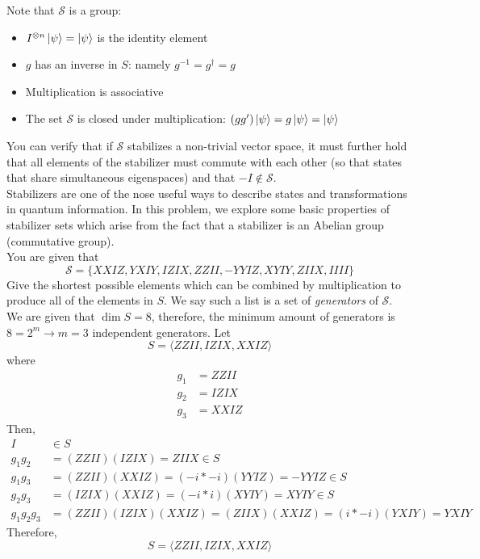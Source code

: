 Note that $\mathcal{S}$ is a group:
\begin{itemize}
    \item $I^{\otimes n} \ket{\psi} = \ket{\psi}$ is the identity element
    \item $g$ has an inverse in $S$: namely $g^{-1} = g^{\dagger} = g$ 
    \item Multiplication is associative
    \item The set $\mathcal{S}$ is closed under multiplication: $(gg')\ket{\psi} = g\ket{\psi} = \ket{\psi}$
\end{itemize}
You can verify that if $\mathcal{S}$ stabilizes a non-trivial vector space, it must further hold that all elements of the stabilizer must commute with each other (so that states that share simultaneous eigenspaces) and that $-I \notin \mathcal{S}$. \\

Stabilizers are one of the nose useful ways to describe states and transformations in quantum information. In this problem, we explore some basic properties of stabilizer sets which arise from the fact that a stabilizer is an Abelian group (commutative group). \\

You are given that 
\begin{equation}
    \mathcal{S} = \{XXIZ, YXIY,IZIX,ZZII,-YYIZ,XYIY,ZIIX,IIII\}
\end{equation}
Give the shortest possible elements which can be combined by multiplication to produce all of the elements in $S$. We say such a list is a set of \textit{generators} of $\mathcal{S}$. \\

We are given that $\dim{S} = 8$, therefore, the minimum amount of generators is $8=2^m \rightarrow m=3$ independent generators. Let 
\begin{equation}
    S = \langle ZZII, IZIX, XXIZ\rangle
\end{equation}
where
\begin{align}
    g_1 &= ZZII \\
    g_2 &= IZIX \\
    g_3 &= XXIZ 
\end{align}
Then,
\begin{align}
    I &\in S \\
    g_1g_2 &= (ZZII)(IZIX) = ZIIX \in S\\
    g_1g_3 &= (ZZII)(XXIZ) = (-i*-i)(YYIZ) = -YYIZ \in S \\ 
    g_2g_3 &= (IZIX)(XXIZ) = (-i*i)(XYIY) = XYIY \in S \\ 
    g_1g_2g_3 &= (ZZII)(IZIX)(XXIZ) = (ZIIX)(XXIZ) = (i*-i)(YXIY) = YXIY
\end{align}
Therefore, 
\begin{equation}
    S = \langle ZZII, IZIX, XXIZ\rangle
\end{equation}



